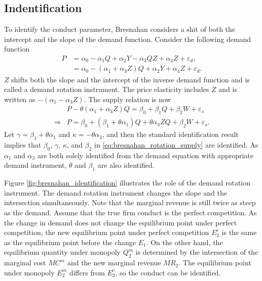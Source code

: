 \documentclass[11pt, a4paper]{article}
\theoremstyle{remark}
\begin{document}
\subsection{Indentification}
To identify the conduct parameter, Bresnahan considers a shit of both the intercept and the slope of the demand function.
Consider the following demand function
\begin{align}
    P & = \alpha_0 - \alpha_1 Q + \alpha_2 Y - \alpha_3 QZ + \alpha_4 Z + \varepsilon_d,\\
    & = \alpha_0 - (\alpha_1 + \alpha_3Z) Q + \alpha_2 Y + \alpha_4 Z + \varepsilon_d. \label{eq:bresnahan_rotation_demand}
\end{align}
$Z$ shifts both the slope and the intercept of the inverse demand function and is called a demand rotation instrument.
The price elasticity includes $Z$ and is written as $-(\alpha_1 - \alpha_3 Z)$.
The supply relation is now
\begin{align}
    & P - \theta (\alpha_1 + \alpha_3Z) Q = \beta_0 + \beta_1 Q + \beta_2 W + \varepsilon_s\\
    \Longrightarrow &  P  = \beta_0 + (\beta_1 + \theta \alpha_1) Q  + \theta \alpha_3ZQ + \beta_2 W + \varepsilon_s.\label{eq:bresnahan_rotation_supply}
\end{align}
Let $\gamma = \beta_1 + \theta \alpha_1$ and $\kappa = -\theta \alpha_3$, and then the standard identification result implies that $\beta_0$, $\gamma$, $\kappa$, and $\beta_2$ in \eqref{eq:bresnahan_rotation_supply} are identified.
As $\alpha_1$ and $\alpha_3$ are both solely identified from the demand equation with appropriate demand instrument, $\theta$ and $\beta_1$ are also identified.




Figure \ref{fig:bresnahan_identification} illustrates the role of the demand rotation instrument.
The demand rotation instrument changes the slope and the intersection simultaneously.
Note that the marginal revenue is still twice as steep as the demand.
Assume that the true firm conduct is the perfect competition.
As the change in demand does not change the equilibrium point under perfect competition, the new equilibrium point under perfect competition $E_2^c$ is the same as the equilibrium point before the change $E_1$.
On the other hand, the equilibrium quantity under monopoly $Q_2^m$ is determined by the intersection of the marginal cost $MC^m$ and the new marginal revenue $MR_2$.
The equilibrium point under monopoly $E_2^m$ differs from $E_2^c$, so the conduct can be identified.
\end{document}
